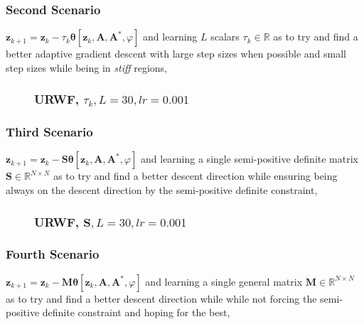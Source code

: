\begin{frame}
  \frametitle{Second Scenario}
  \begin{center}
    $\boldsymbol{z}_{k+1} = \boldsymbol{z}_k - \tau_k\boldsymbol{\theta}[\boldsymbol{z}_k,\boldsymbol{A},\boldsymbol{A^*},\varphi]$
    and learning $L$ scalars $\tau_k\in\mathbb{R}$ as to try and find a better adaptive gradient descent with large step sizes when possible 
    and small step sizes while being in \emph{stiff} regions, 
  \end{center}
  
\end{frame}

\begin{frame}
  \begin{figure}
    \frametitle{URWF, $\tau_k,L=30,lr=0.001$}
    \centering
    \resizebox{0.9\textwidth}{!}{}
    \label{fig:rwf_s_01_l_30_lr_0.001}
  \end{figure}
\end{frame}

\begin{frame}
  \frametitle{Third Scenario}
  \begin{center}
    $\boldsymbol{z}_{k+1} = \boldsymbol{z}_k - \boldsymbol{S}\boldsymbol{\theta}[\boldsymbol{z}_k,\boldsymbol{A},\boldsymbol{A^*},\varphi]$
    and learning a single semi-positive definite matrix $\boldsymbol{S}\in \mathbb{R}^{N \times N}$ as to try and find a better descent direction while 
    ensuring being always on the descent direction by the semi-positive definite constraint,
  \end{center}
\end{frame}

\begin{frame}
  \begin{figure}
    \frametitle{URWF, $\boldsymbol{S},L=30,lr=0.001$}
    \centering
    \resizebox{0.9\textwidth}{!}{}
    \label{fig:rwf_s_03_l_30_lr_0.001}
  \end{figure}
\end{frame}



\begin{frame}
  \frametitle{Fourth Scenario}
  \begin{center}
    $\boldsymbol{z}_{k+1} = \boldsymbol{z}_k - \boldsymbol{M}\boldsymbol{\theta}[\boldsymbol{z}_k,\boldsymbol{A},\boldsymbol{A^*},\varphi]$
    and learning a single general matrix $\boldsymbol{M}\in \mathbb{R}^{N \times N}$ as to try and find a better descent direction while 
    while not forcing the semi-positive definite constraint and hoping for the best,
  \end{center}
\end{frame}

